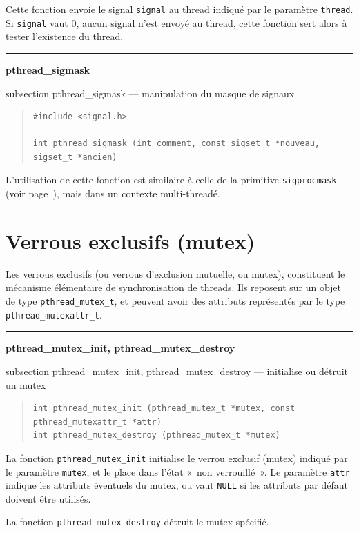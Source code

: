 \documentclass [twoside] {report}
\newcommand {\primitive} [1]
    {
	\phantomsection
	{\large \textbf {#1}}
	\addcontentsline {toc} {subsection} {#1}
    }
\newcommand {\separation}
    {
	\vspace {5mm}
	\nopagebreak
	\hrule
    }
\begin{document}
Cette fonction envoie le signal \texttt {signal} au thread indiqué par le
paramètre \texttt {thread}.  Si \texttt {signal} vaut 0, aucun signal
n'est envoyé au thread, cette fonction sert alors à tester l'existence
du thread.


\separation
\primitive {pthread\_sigmask} --- manipulation du masque de signaux

\begin {quote}
\begin {verbatim}
#include <signal.h>

int pthread_sigmask (int comment, const sigset_t *nouveau, sigset_t *ancien)
\end{verbatim}
\end {quote}

L'utilisation de cette fonction est similaire à celle de la primitive
\texttt {sigprocmask} (voir page~\pageref {sigprocmask}), mais dans un
contexte multi-threadé.


\section {Verrous exclusifs (mutex)}

Les verrous exclusifs (ou verrous d'exclusion mutuelle, ou mutex),
constituent le mécanisme élémentaire de synchronisation de threads. Ils
reposent sur un objet de type \verb|pthread_mutex_t|, et peuvent avoir
des attributs représentés par le type \verb|pthread_mutexattr_t|.

\separation
\primitive {pthread\_mutex\_init, pthread\_mutex\_destroy} --- initialise ou détruit un mutex

\begin {quote}
\begin {verbatim}
int pthread_mutex_init (pthread_mutex_t *mutex, const pthread_mutexattr_t *attr)
int pthread_mutex_destroy (pthread_mutex_t *mutex)
\end{verbatim}
\end {quote}

La fonction \verb|pthread_mutex_init| initialise le verrou exclusif
(mutex) indiqué par le paramètre \texttt {mutex}, et le place dans
l'état «~non verrouillé~». Le paramètre \texttt {attr} indique les
attributs éventuels du mutex, ou vaut \texttt {NULL} si les attributs
par défaut doivent être utilisés.

La fonction \verb|pthread_mutex_destroy| détruit le mutex spécifié.
\end{document}

